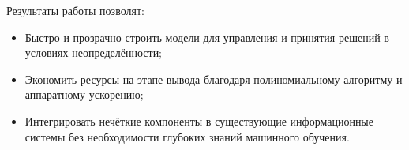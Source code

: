 Результаты работы позволят:
\begin{itemize}
  \item Быстро и прозрачно строить модели для управления и принятия решений в условиях неопределённости;
  \item Экономить ресурсы на этапе вывода благодаря полиномиальному алгоритму и аппаратному ускорению;
  \item Интегрировать нечёткие компоненты в существующие информационные системы без необходимости глубоких знаний машинного обучения.
\end{itemize}

